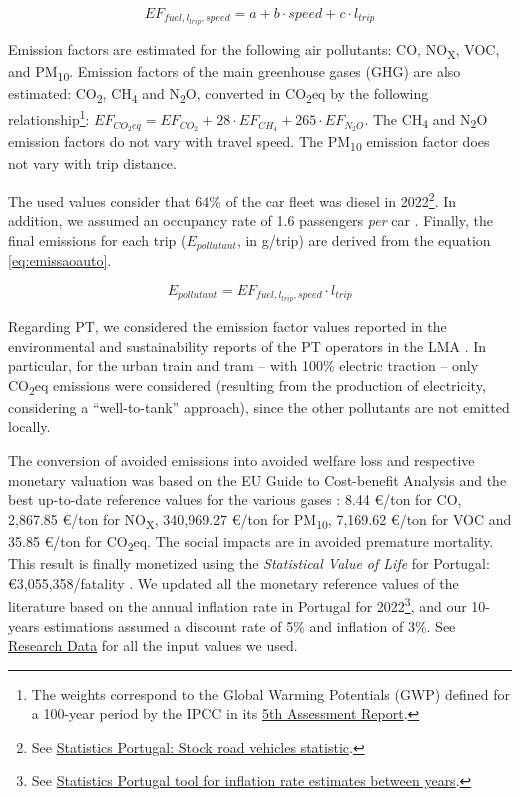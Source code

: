 \documentclass[review, doubleblind, 3p,
authoryear]{elsarticle} %
\begin{document}
\begin{equation}\label{eq:fatoremissaoauto}
{EF}_{fuel,l_{trip},speed} = a + b\cdot {speed} + c\cdot l_{trip}
\end{equation}

Emission factors are estimated for the following air pollutants: CO,
NO\textsubscript{X}, VOC, and PM\textsubscript{10}. Emission factors of
the main greenhouse gases (GHG) are also estimated: CO\textsubscript{2},
CH\textsubscript{4} and N\textsubscript{2}O, converted in
CO\textsubscript{2}eq by the following relationship\footnote{The weights
  correspond to the Global Warming Potentials (GWP) defined for a
  100-year period by the IPCC in its
  \href{https://www.ipcc.ch/report/ar5/}{5th Assessment Report}.}:
\(EF_{CO_2eq} = EF_{CO_2} + 28\cdot EF_{CH_4} + 265\cdot EF_{N_2O}\).
The CH\textsubscript{4} and N\textsubscript{2}O emission factors do not
vary with travel speed. The PM\textsubscript{10} emission factor does
not vary with trip distance.

The used values consider that 64\% of the car fleet was diesel in
2022\footnote{See
  \href{https://smi.ine.pt/Indicador/Detalhes/10837?LANG=EN}{Statistics
  Portugal: Stock road vehicles statistic}.}. In addition, we assumed an
occupancy rate of 1.6 passengers \emph{per} car \citep{IMOB}. Finally,
the final emissions for each trip (\(E_{pollutant}\), in g/trip) are
derived from the equation \ref{eq:emissaoauto}.

\begin{equation}\label{eq:emissaoauto}
{E}_{pollutant} = {EF}_{fuel,l_{trip},speed}\cdot l_{trip}
\end{equation}

Regarding PT, we considered the emission factor values reported in the
environmental and sustainability reports of the PT operators in the LMA
\citep{Carris2019s, Metro2019s, CP2019s, Transtejo2014}. In particular,
for the urban train and tram -- with 100\% electric traction -- only
CO\textsubscript{2}eq emissions were considered (resulting from the
production of electricity, considering a ``well-to-tank'' approach),
since the other pollutants are not emitted locally.

The conversion of avoided emissions into avoided welfare loss and
respective monetary valuation was based on the EU Guide to Cost-benefit
Analysis \citep{EuropeanCommission2014} and the best up-to-date
reference values for the various gases
\citep{EuropeanCommission2014, bickel2006, UNITE}: 8.44 €/ton for CO,
2,867.85 €/ton for NO\textsubscript{X}, 340,969.27 €/ton for
PM\textsubscript{10}, 7,169.62 €/ton for VOC and 35.85 €/ton for
CO\textsubscript{2}eq. The social impacts are in avoided premature
mortality. This result is finally monetized using the \emph{Statistical
Value of Life} for Portugal: €3,055,358/fatality \citep{ANSR2021}. We
updated all the monetary reference values of the literature based on the
annual inflation rate in Portugal for 2022\footnote{See
  \href{https://www.ine.pt/xportal/xmain?xpid=INE&xpgid=ipc}{Statistics
  Portugal tool for inflation rate estimates between years}.}, and our
10-years estimations assumed a discount rate of 5\% and inflation of
3\%. See \hyperref[research-data]{Research Data} for all the input
values we used.
\end{document}
